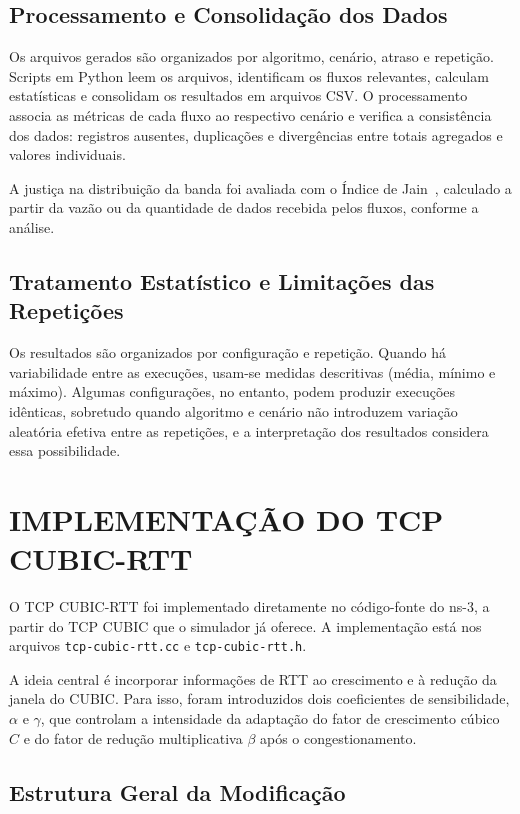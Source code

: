 \documentclass[a4paper,12pt]{monografia}
\begin{document}
\subsection{Processamento e Consolidação dos Dados}

Os arquivos gerados são organizados por algoritmo, cenário, atraso e repetição. Scripts em Python leem os arquivos, identificam os fluxos relevantes, calculam estatísticas e consolidam os resultados em arquivos CSV. O processamento associa as métricas de cada fluxo ao respectivo cenário e verifica a consistência dos dados: registros ausentes, duplicações e divergências entre totais agregados e valores individuais.

A justiça na distribuição da banda foi avaliada com o Índice de Jain~\cite{jain1984}, calculado a partir da vazão ou da quantidade de dados recebida pelos fluxos, conforme a análise.

\subsection{Tratamento Estatístico e Limitações das Repetições}

Os resultados são organizados por configuração e repetição. Quando há variabilidade entre as execuções, usam-se medidas descritivas (média, mínimo e máximo). Algumas configurações, no entanto, podem produzir execuções idênticas, sobretudo quando algoritmo e cenário não introduzem variação aleatória efetiva entre as repetições, e a interpretação dos resultados considera essa possibilidade.

\section{IMPLEMENTAÇÃO DO TCP CUBIC-RTT}

O TCP CUBIC-RTT foi implementado diretamente no código-fonte do ns-3, a partir do TCP CUBIC que o simulador já oferece. A implementação está nos arquivos \texttt{tcp-cubic-rtt.cc} e \texttt{tcp-cubic-rtt.h}.

A ideia central é incorporar informações de RTT ao crescimento e à redução da janela do CUBIC. Para isso, foram introduzidos dois coeficientes de sensibilidade, $\alpha$ e $\gamma$, que controlam a intensidade da adaptação do fator de crescimento cúbico $C$ e do fator de redução multiplicativa $\beta$ após o congestionamento.

\subsection{Estrutura Geral da Modificação}
\end{document}
